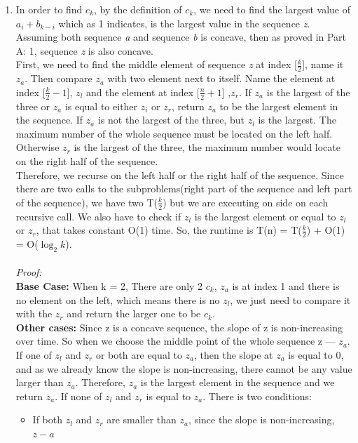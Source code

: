 \documentclass{article}
\begin{document}
\begin{enumerate}
 \item  In order to find $c_k$, by the definition of $c_k$, we need to find 
 the largest value of $a_i + b_{k-i}$ which as 1 indicates, is the largest 
 value in the sequence \textit{z}. 
 Assuming both sequence \textit{a} and sequence \textit{b} is concave, then 
 as proved in Part A: 1, sequence \textit{z} is also concave. \\First, we need 
 to find the middle element of sequence \textit{z} at index [$\frac{k}{2}$], 
 name it $z_a$. Then compare $z_a$ with two element next to itself. Name the element
  at index [$\frac{k}{2}-1$], $z_l$ and the element at index [$\frac{n}{2}+1$]
 ,$z_r$. If $z_a$ is the largest of the three or $z_a$ is equal to either $z_i$ 
 or $z_r$, return $z_a$ to be the largest element in the sequence. If $z_a$ is not 
 the largest of the three, but $z_l$ is the largest. The maximum number
 of the whole sequence must be located on the left half. Otherwise $z_r$ is 
 the largest of the three, the maximum number would locate on the right half of 
 the sequence. \\
 Therefore, we recurse on the left half or the right half of the sequence. 
 Since there are two calls to the subproblems(right part of the sequence and 
 left part of the sequence), we have two T($\frac{k}{2}$)
 but we are executing on side on each recursive call. We also have to check 
 if $z_l$ is the largest element or equal to $z_l$ or $z_r$, that takes 
 constant O(1) time. So, the runtime is T(n) =  T($\frac{k}{2}$) + O(1) = O($\log_{2} k$).\\\\
 \textit{Proof:} \\
 \textbf{Base Case:} When k = 2, There are only 2 $c_k$, $z_a$ is at index 1 and
 there is no element on the left, which means there is no $z_l$, we just need to 
 compare it with the $z_r$ and return the larger one to be $c_k$.\\
 \textbf{Other cases:} Since z is a concave sequence, the slope of z is non-increasing
 over time. So when we choose the middle point of the whole sequence z --- $z_a$. 
 If one of $z_l$ and $z_r$ or both are equal to $z_a$, then the slope at $z_a$ is 
 equal to 0, and as we already know the slope is non-increasing, there cannot be any 
 value larger than $z_a$. Therefore, $z_a$ is the largest element in the sequence and
  we return $z_a$. If none of $z_l$ and $z_r$ is equal to $z_a$. 
 There is two conditions:
 \begin{itemize}
     \item If both $z_l$ and $z_r$ are smaller than $z_a$, since the slope is non-increasing, $z-a$ 

\end{itemize}
\end{enumerate}
\end{document}
